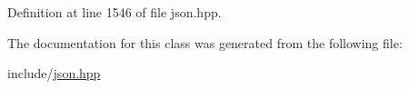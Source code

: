 Definition at line 1546 of file json.\+hpp.



The documentation for this class was generated from the following file\+:\begin{DoxyCompactItemize}
\item 
include/\hyperlink{json_8hpp}{json.\+hpp}\end{DoxyCompactItemize}
